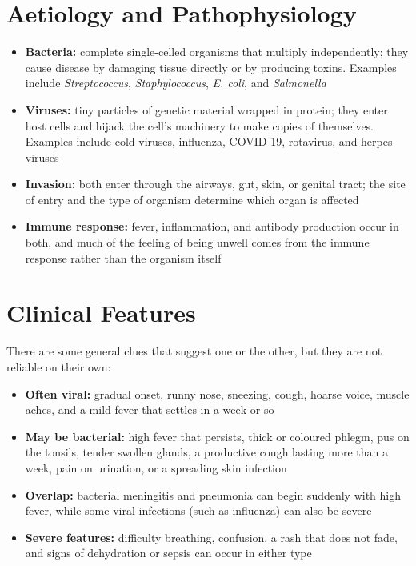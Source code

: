 \section*{Aetiology and Pathophysiology}
\begin{itemize}
    \item \textbf{Bacteria:} complete single-celled organisms that multiply independently; they cause disease by damaging tissue directly or by producing toxins. Examples include \textit{Streptococcus}, \textit{Staphylococcus}, \textit{E. coli}, and \textit{Salmonella}
    \item \textbf{Viruses:} tiny particles of genetic material wrapped in protein; they enter host cells and hijack the cell's machinery to make copies of themselves. Examples include cold viruses, influenza, COVID-19, rotavirus, and herpes viruses
    \item \textbf{Invasion:} both enter through the airways, gut, skin, or genital tract; the site of entry and the type of organism determine which organ is affected
    \item \textbf{Immune response:} fever, inflammation, and antibody production occur in both, and much of the feeling of being unwell comes from the immune response rather than the organism itself
\end{itemize}

\section*{Clinical Features}
There are some general clues that suggest one or the other, but they are not reliable on their own:

\begin{itemize}
    \item \textbf{Often viral:} gradual onset, runny nose, sneezing, cough, hoarse voice, muscle aches, and a mild fever that settles in a week or so
    \item \textbf{May be bacterial:} high fever that persists, thick or coloured phlegm, pus on the tonsils, tender swollen glands, a productive cough lasting more than a week, pain on urination, or a spreading skin infection
    \item \textbf{Overlap:} bacterial meningitis and pneumonia can begin suddenly with high fever, while some viral infections (such as influenza) can also be severe
    \item \textbf{Severe features:} difficulty breathing, confusion, a rash that does not fade, and signs of dehydration or sepsis can occur in either type
\end{itemize}

